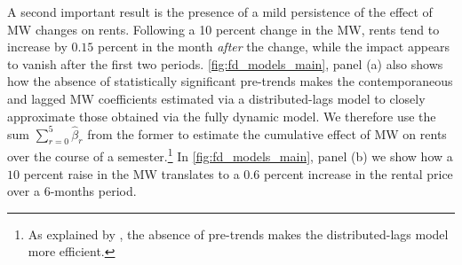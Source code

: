 A second important result is the presence of a mild persistence of the effect of MW changes on rents. 
Following a 10 percent change in the MW, rents tend to 
increase by $0.15$ percent in the month \textit{after} the change, while the impact appears to vanish 
after the first two periods. 
\autoref{fig:fd_models_main}, panel (a) also shows how the absence of statistically significant 
pre-trends makes the contemporaneous and lagged MW coefficients estimated via a distributed-lags
model to closely approximate those obtained via the fully dynamic model. 
We therefore use the sum $\sum\limits_{r = 0}^{5}\hat\beta_r$ from 
the former to estimate the cumulative effect of MW on rents over the course of a semester.\footnote{As 
	explained by \textcite{BorusyakJaravel2017}, the absence of pre-trends  makes the distributed-lags model 
more efficient.} 
In \autoref{fig:fd_models_main}, panel (b) we show how a $10$ percent raise in the MW 
translates to a $0.6$ percent increase in the rental price over a 6-months period. 

